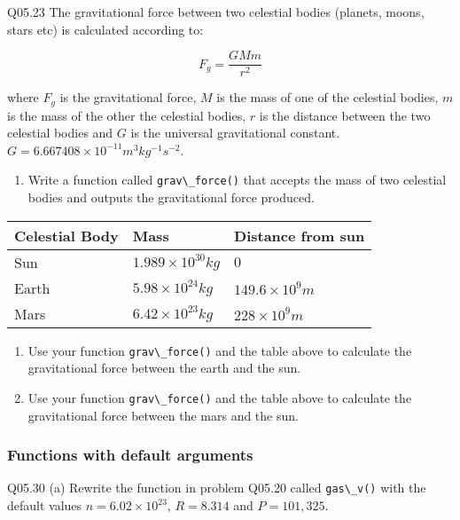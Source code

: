 \documentclass{book}
\providecommand{\tightlist}{%
      \setlength{\itemsep}{0pt}\setlength{\parskip}{0pt}}
\newcommand{\passthrough}[1]{#1}
\begin{document}
Q05.23 The gravitational force between two celestial bodies (planets,
moons, stars etc) is calculated according to:

\[ F_g = \frac{GMm}{r^2} \]

where \(F_g\) is the gravitational force, \(M\) is the mass of one of
the celestial bodies, \(m\) is the mass of the other the celestial
bodies, \(r\) is the distance between the two celestial bodies and \(G\)
is the universal gravitational constant.
\(G=6.667408 \times 10^{-11} m^3 kg^{-1}s^{-2}\).

\begin{enumerate}
\def\labelenumi{(\alph{enumi})}
\tightlist
\item
  Write a function called \passthrough{\lstinline!grav\_force()!} that
  accepts the mass of two celestial bodies and outputs the gravitational
  force produced.
\end{enumerate}

\begin{longtable}[]{@{}lll@{}}
\toprule
Celestial Body & Mass & Distance from sun\tabularnewline
\midrule
\endhead
Sun & \(1.989\times10^{30} kg\) & \(0\)\tabularnewline
Earth & \(5.98\times10^{24} kg\) &
\(149.6 \times 10^9 m\)\tabularnewline
Mars & \(6.42\times10^{23} kg\) & \(228 \times 10^9 m\)\tabularnewline
\bottomrule
\end{longtable}

\begin{enumerate}
\def\labelenumi{(\alph{enumi})}
\setcounter{enumi}{1}
\item
  Use your function \passthrough{\lstinline!grav\_force()!} and the
  table above to calculate the gravitational force between the earth and
  the sun.
\item
  Use your function \passthrough{\lstinline!grav\_force()!} and the
  table above to calculate the gravitational force between the mars and
  the sun.
\end{enumerate}
    




    
        \hypertarget{functions-with-default-arguments}{%
\subsubsection{Functions with default
arguments}\label{functions-with-default-arguments}}

Q05.30 (a) Rewrite the function in problem Q05.20 called
\passthrough{\lstinline!gas\_v()!} with the default values
\(n = 6.02 \times 10^{23}\), \(R = 8.314\) and \(P = 101,325\).
\end{document}

